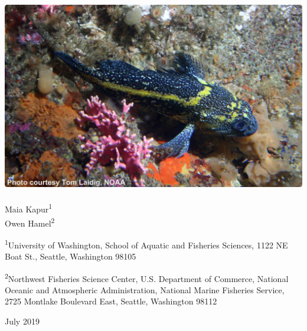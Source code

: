 
\begin{center}
\thispagestyle{empty}

\vspace{.5cm}

\includegraphics{chinarockfish_small}~\\[1cm]

Maia Kapur\textsuperscript{1}\\
Owen Hamel\textsuperscript{2}\\

\vspace{.5cm}

\small
\textsuperscript{1}University of Washington, School of Aquatic and Fisheries Sciences, 1122 NE Boat St., Seattle, Washington 98105\\

\vspace{.3cm}

\textsuperscript{2}Northwest Fisheries Science Center, U.S. Department of Commerce, National Oceanic and Atmospheric Administration, National Marine Fisheries Service, 2725 Montlake Boulevard East, Seattle, Washington 98112\\

\vspace{.3cm}

\vfill

\vspace{.2cm}
{\large July 2019}

\maketitle

\setcounter{page}{1}
\end{center}


